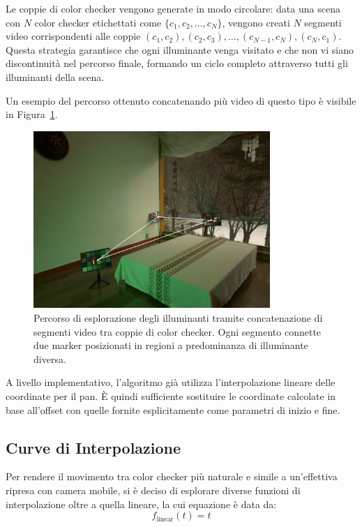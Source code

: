 Le coppie di color checker vengono generate in modo circolare: data una scena con $N$ color checker etichettati come $\{c_1, c_2, \ldots, c_N\}$, vengono creati $N$ segmenti video corrispondenti alle coppie $(c_1, c_2), (c_2, c_3), \ldots, (c_{N-1}, c_N), (c_N, c_1)$. Questa strategia garantisce che ogni illuminante venga visitato e che non vi siano discontinuità nel percorso finale, formando un ciclo completo attraverso tutti gli illuminanti della scena.

Un esempio del percorso ottenuto concatenando più video di questo tipo è visibile in Figura~\ref{fig:percorso_video}.

\begin{figure}[ht]
  \centering
  \includegraphics[width=0.8\textwidth]{img/percorso_video.png}
  \caption{Percorso di esplorazione degli illuminanti tramite concatenazione di segmenti video tra coppie di color checker. Ogni segmento connette due marker posizionati in regioni a predominanza di illuminante diversa.}
  \label{fig:percorso_video}
\end{figure}

A livello implementativo, l'algoritmo già utilizza l'interpolazione lineare delle coordinate per il pan. È quindi sufficiente sostituire le coordinate calcolate in base all'offset con quelle fornite esplicitamente come parametri di inizio e fine.

\subsection{Curve di Interpolazione}
Per rendere il movimento tra color checker più naturale e simile a un'effettiva ripresa con camera mobile, si è deciso di esplorare diverse funzioni di interpolazione oltre a quella lineare, la cui equazione è data da:
\begin{equation}
    f_{\text{linear}}(t) = t
    \label{eq:interp_linear}
\end{equation}

